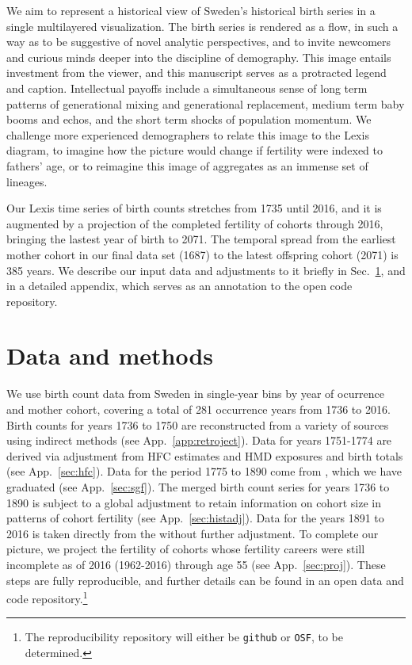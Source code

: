 \documentclass{article}
\begin{document}
We aim to represent a historical view of Sweden's historical birth series in a single multilayered visualization. The birth series is rendered as a flow, in such a way as to be suggestive of novel analytic perspectives, and to invite newcomers and curious minds deeper into the discipline of demography. This image entails investment from the viewer, and this manuscript serves as a protracted legend and caption. Intellectual payoffs include a simultaneous sense of long term patterns of generational mixing and generational replacement, medium term baby booms and echos, and the short term shocks of population momentum. We challenge more experienced demographers to relate this image to the Lexis diagram, to imagine how the picture would change if fertility were indexed to fathers' age, or to reimagine this image of aggregates as an immense set of lineages.

Our Lexis time series of birth counts stretches from 1735 until 2016, and it is augmented by a projection of the completed fertility of cohorts through 2016, bringing the lastest year of birth to 2071. The temporal spread from the earliest mother cohort in our final data set (1687) to the latest offspring cohort (2071) is 385 years. We describe our input data and adjustments to it briefly in Sec.~\ref{sec:data}, and in a detailed appendix, which serves as an annotation to the open code repository.

\section{Data and methods}
\label{sec:data}
We use birth count data from Sweden in single-year bins by year of ocurrence and mother cohort, covering a total of 281 occurrence years from 1736 to 2016. Birth counts for years 1736 to 1750 are reconstructed from a variety of sources \citep{HFC, HMD, sweden1969historisk} using indirect methods (see App.~\ref{app:retroject}). Data for years 1751-1774 are derived via adjustment from HFC estimates and HMD exposures and birth totals (see App.~\ref{sec:hfc}). Data for the period 1775 to 1890 come from \citet{sgf1907}, which we have graduated (see App.~\ref{sec:sgf}). The merged birth count series for years 1736 to 1890 is subject to a global adjustment to retain information on cohort size in patterns of cohort fertility (see App.~\ref{sec:histadj}). Data for the years 1891 to 2016 is taken directly from the \citet{HFD} without further adjustment. To complete our picture, we project the fertility of cohorts whose fertility careers were still incomplete as of 2016 (1962-2016) through age 55 (see App.~\ref{sec:proj}). These steps are fully reproducible, and further details can be found in an open data and code repository.\footnote{The reproducibility repository will either be \texttt{github} or \texttt{OSF}, to be determined.}
\end{document}

